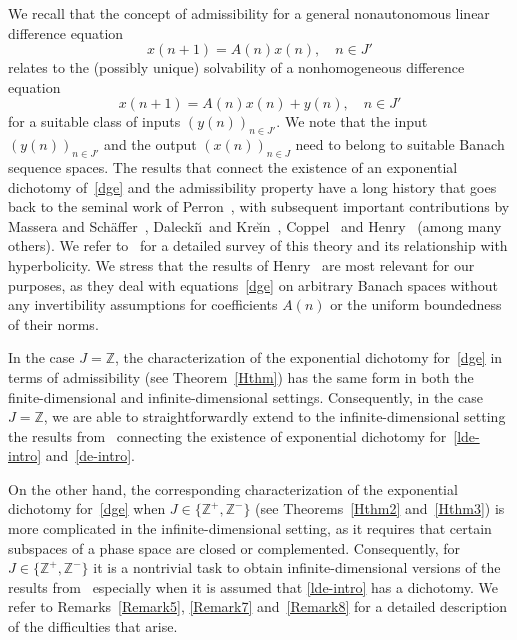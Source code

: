 \documentclass[11pt,reqno,a4paper]{amsart}
\theoremstyle{plain}
\numberwithin{equation}{section}
\theoremstyle{remark}
\def\Z{\mathbb{Z}}
\begin{document}
We recall that the concept of admissibility for a general nonautonomous linear difference equation
\begin{equation}\label{dge}
x(n+1)=A(n)x(n), \quad n\in J'
\end{equation}
 relates to the (possibly unique) solvability of a nonhomogeneous difference equation
\[
x(n+1)=A(n)x(n)+y(n), \quad n\in J'
\]
for a suitable class of inputs $(y(n))_{n\in J'}$. We note that the input $(y(n))_{n\in J'}$ and the output $(x(n))_{n\in J}$ need to belong to suitable Banach sequence spaces.  The results that connect the existence of an exponential dichotomy of~\eqref{dge} and the admissibility property have a long history that goes back to the seminal work of Perron~\cite{Pe}, with subsequent important contributions by Massera and Sch\"affer~\cite{MS}, Dalecki\u \i \ and Kre\u \i n~\cite{DK}, Coppel~\cite{Coppel} and Henry~\cite{H} (among many others). We refer to~\cite{BDVbook} for a detailed survey of this theory and its relationship with hyperbolicity.
We stress that the results of Henry~\cite{H, H1}
 are most relevant for our purposes, as they deal with equations~\eqref{dge} on arbitrary Banach spaces without any invertibility assumptions for coefficients $A(n)$ or the uniform boundedness of their norms. 

 In the case $J=\Z$, the characterization of the exponential dichotomy for~\eqref{dge} in terms of admissibility (see Theorem~\ref{Hthm}) has the same form in both the finite-dimensional and infinite-dimensional settings. Consequently, in the case $J=\Z$, we are able to straightforwardly extend to the infinite-dimensional setting the results from~\cite{DP} connecting the existence of exponential dichotomy for~\eqref{lde-intro} and~\eqref{de-intro}.

On the other hand, the corresponding characterization of the exponential dichotomy for~\eqref{dge} when $J\in \{\Z^+, \Z^-\}$ (see Theorems~\ref{Hthm2} and~\ref{Hthm3}) is more complicated in the infinite-dimensional setting, as it requires that certain subspaces of a phase space are closed or complemented. Consequently, for $J\in \{\Z^+, \Z^-\}$ it is a nontrivial task to obtain infinite-dimensional versions of the results from~\cite{DP} especially when it is assumed that \eqref{lde-intro} has a dichotomy. We refer to Remarks~\ref{Remark5}, \ref{Remark7} and~\ref{Remark8} for a detailed description of the difficulties that arise.
\end{document}
